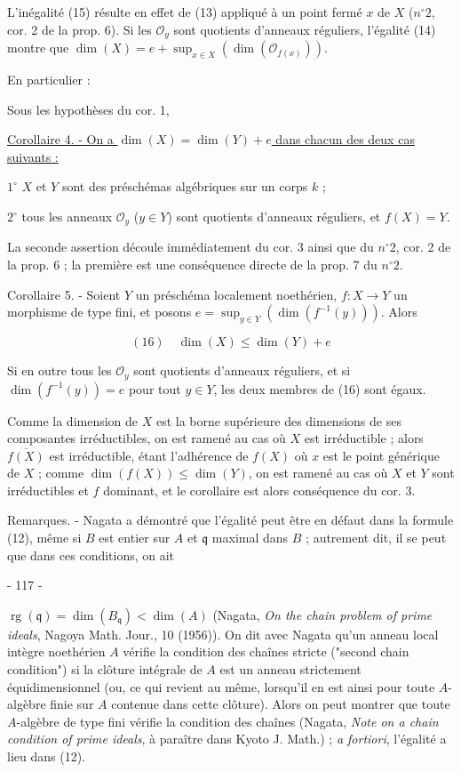 L'inégalité (15) résulte en effet de (13) appliqué à un point fermé $x$ de $X$ ($n^\circ 2$, cor. 2 de la prop. 6). Si les $\mathcal{O}_y$ sont quotients d'anneaux réguliers, l'égalité (14) montre que $\dim(X) = e + \sup_{x \in X} (\dim(\mathcal{O}_{f(x)}))$.

En particulier :

Sous les hypothèses du cor. 1,

\underline{Corollaire 4. - On a $\dim(X) = \dim(Y) + e$ dans chacun des deux cas suivants :}

$1^\circ$ $X$ et $Y$ sont des préschémas algébriques sur un corps $k$ ;

$2^\circ$ tous les anneaux $\mathcal{O}_y$ ($y \in Y$) sont quotients d'anneaux réguliers, et $f(X) = Y$.

La seconde assertion découle immédiatement du cor. 3 ainsi que du $n^\circ 2$, cor. 2 de la prop. 6 ; la première est une conséquence directe de la prop. 7 du $n^\circ 2$.

Corollaire 5. - Soient $Y$ un préschéma localement noethérien, $f: X \to Y$ un morphisme de type fini, et posons $e = \sup_{y \in Y} (\dim(f^{-1}(y)))$. Alors

$$(16) \quad \dim(X) \leqslant \dim(Y) + e$$

Si en outre tous les $\mathcal{O}_y$ sont quotients d'anneaux réguliers, et si $\dim(f^{-1}(y)) = e$ pour tout $y \in Y$, les deux membres de (16) sont égaux.

Comme la dimension de $X$ est la borne supérieure des dimensions de ses composantes irréductibles, on est ramené au cas où $X$ est irréductible ; alors $\overline{f(X)}$ est irréductible, étant l'adhérence de $f(X)$  où $x$ est le point générique de $X$ ; comme $\dim(f(X)) \leqslant \dim(Y)$, on est ramené au cas où $X$ et $Y$ sont irréductibles et $f$ dominant, et le corollaire est alors conséquence du cor. 3.

Remarques. - Nagata a démontré que l'égalité peut être en défaut dans la formule (12), même si $B$ est entier sur $A$ et $\mathfrak{q}$ maximal dans $B$ ; autrement dit, il se peut que dans ces conditions, on ait

\newpage


- 117 -

$\operatorname{rg}(\mathfrak{q}) = \dim(B_{\mathfrak{q}}) < \dim(A)$ (Nagata, \emph{On the chain problem of prime ideals}, Nagoya Math. Jour., 10 (1956)). On dit avec Nagata qu'un anneau local intègre noethérien $A$ vérifie la condition des chaînes stricte ("second chain condition") si la clôture intégrale de $A$ est un anneau strictement équidimensionnel (ou, ce qui revient au même, lorsqu'il en est ainsi pour toute $A$-algèbre finie sur $A$ contenue dans cette clôture). Alors on peut montrer que toute $A$-algèbre de type fini vérifie la condition des chaînes (Nagata, \emph{Note on a chain condition of prime ideals}, à paraître dans Kyoto J. Math.) ; \emph{a fortiori}, l'égalité a lieu dans (12).

